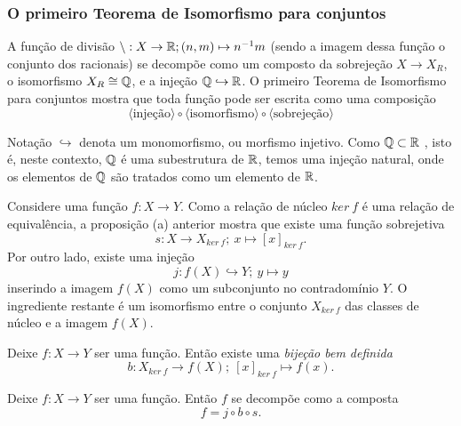 \subsubsection{O primeiro Teorema de Isomorfismo para conjuntos}
A função de divisão $\setminus: X\to \mathbb{R}; (n,m) \mapsto n^{-1}m$ (sendo a imagem dessa função o conjunto dos racionais) se decompõe como um composto da sobrejeção $X \to X_{R}$, o isomorfismo $X_{R} \cong \mathbb{Q}$, e a injeção $\mathbb{Q} \hookrightarrow \mathbb{R}$. O primeiro Teorema de Isomorfismo para conjuntos mostra que toda função pode ser escrita como uma composição $$\langle \textrm{injeção} \rangle \circ \langle \textrm{isomorfismo} \rangle \circ \langle \textrm{sobrejeção} \rangle $$
\begin{mymdframed}{Notação}
  $\hookrightarrow$ denota um monomorfismo, ou morfismo injetivo. Como $\mathbb{Q} \subset \mathbb{R}$ , isto é, neste contexto, $\mathbb{Q}$ é uma subestrutura de $\mathbb{R}$, temos uma injeção natural, onde os elementos de $\mathbb{Q}$ são tratados como um elemento de $\mathbb{R}$.
\end{mymdframed}
Considere uma função $f: X\to Y$. Como a relação de núcleo $ker\ f$ é uma relação de equivalência, a proposição (a) anterior mostra que existe uma função sobrejetiva $$s: X\to X_{ker\ f};\ x\mapsto \left[x\right]_{ker\ f}.$$
Por outro lado, existe uma injeção $$j: f(X) \hookrightarrow Y;\ y\mapsto y$$ inserindo a imagem $f(X)$ como um subconjunto no contradomínio $Y$.
O ingrediente restante é um isomorfismo entre o conjunto $X_{ker\ f}$ das classes de núcleo e a imagem $f(X)$.

\begin{stat}
  Deixe $f: X\to Y$ ser uma função. Então existe uma \emph{bijeção bem definida} $$ b: X_{ker\ f} \to f(X);\ \left[x\right]_{ker\ f} \mapsto f(x).$$
\end{stat}
\begin{theorem}
  Deixe $f: X\to Y$ ser uma função. Então $f$ se decompõe como a composta $$f = j\circ b \circ s.$$ 
\end{theorem}

